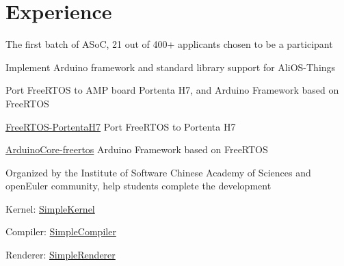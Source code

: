 \documentclass[]{deedy-resume-openfont}
\begin{document}
\begin{minipage}[t]{0.73\textwidth} 


\section{Experience}
\vspace{\topsep}
\begin{tightemize}
    \item The first batch of ASoC, 21 out of 400+ applicants chosen to be a participant
    \item Implement Arduino framework and standard library support for AliOS-Things
\end{tightemize}
\sectionsep

\begin{tightemize}
    \item Port FreeRTOS to AMP board Portenta H7, and Arduino Framework based on FreeRTOS
    \item \href{https://github.com/MRNIU/FreeRTOS-PortentaH7}{FreeRTOS-PortentaH7} Port FreeRTOS to Portenta H7
    \item \href{https://github.com/MRNIU/ArduinoCore-freertos}{ArduinoCore-freertos} Arduino Framework based on FreeRTOS
\end{tightemize}
\sectionsep

\begin{tightemize}
    \item Organized by the Institute of Software Chinese Academy of Sciences and openEuler community, 
            help students complete the development
    \item Kernel: \href{https://github.com/Simple-XX/SimpleKernel}{SimpleKernel}
    \item Compiler: \href{https://github.com/Simple-XX/SimpleCompiler}{SimpleCompiler}
    \item Renderer: \href{https://github.com/Simple-XX/SimpleRenderer}{SimpleRenderer}
\end{tightemize}
\sectionsep


\end{minipage}
\end{document}
